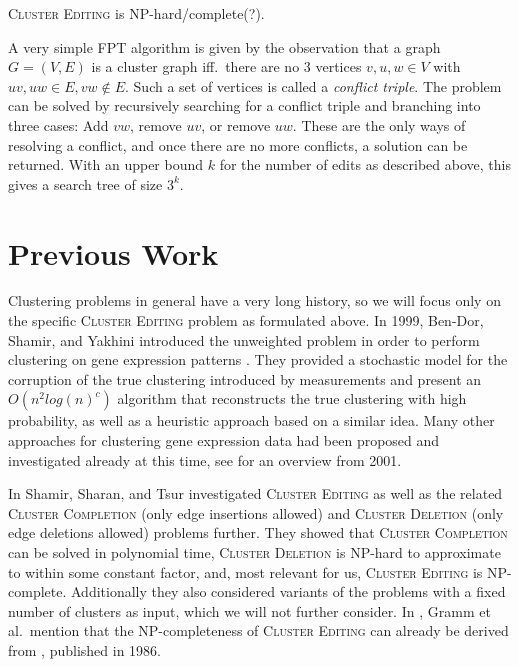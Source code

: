 \documentclass{article}
\begin{document}
\textsc{Cluster Editing} is NP-hard/complete(?).


A very simple FPT algorithm is given by the observation that a graph $G = (V, E)$ is a cluster graph
iff.\ there are no 3 vertices $v, u, w \in V$ with $uv, uw \in E, vw \notin E$. Such a set of
vertices is called a \emph{conflict triple}. The problem can be solved by recursively searching for
a conflict triple and branching into three cases: Add $vw$, remove $uv$, or remove $uw$. These are
the only ways of resolving a conflict, and once there are no more conflicts, a solution can be
returned. With an upper bound $k$ for the number of edits as described above, this gives a search
tree of size $3^k$.



\section{Previous Work}


Clustering problems in general have a very long history, so we will focus only on the specific
\textsc{Cluster Editing} problem as formulated above. In 1999, Ben-Dor, Shamir, and Yakhini
introduced the unweighted problem in order to perform clustering on gene expression patterns
\cite{BenDor}. They provided a stochastic model for the corruption of the true clustering introduced
by measurements and present an $O(n^2 log(n)^c)$ algorithm that reconstructs the true clustering
with high probability, as well as a heuristic approach based on a similar idea. Many other
approaches for clustering gene expression data had been proposed and investigated already at this
time, see \cite{ShamirOverview} for an overview from 2001.

In \cite{ShamirModifications} Shamir, Sharan, and Tsur investigated \textsc{Cluster Editing} as well
as the related \textsc{Cluster Completion} (only edge insertions allowed) and \textsc{Cluster
Deletion} (only edge deletions allowed) problems further. They showed that \textsc{Cluster
Completion} can be solved in polynomial time, \textsc{Cluster Deletion} is NP-hard to approximate to
within some constant factor, and, most relevant for us, \textsc{Cluster Editing} is NP-complete.
Additionally they also considered variants of the problems with a fixed number of clusters as input,
which we will not further consider. In \cite{Gramm}, Gramm et al.\ mention that the NP-completeness
of \textsc{Cluster Editing} can already be derived from \cite{Krivanek}, published in 1986.
\end{document}
